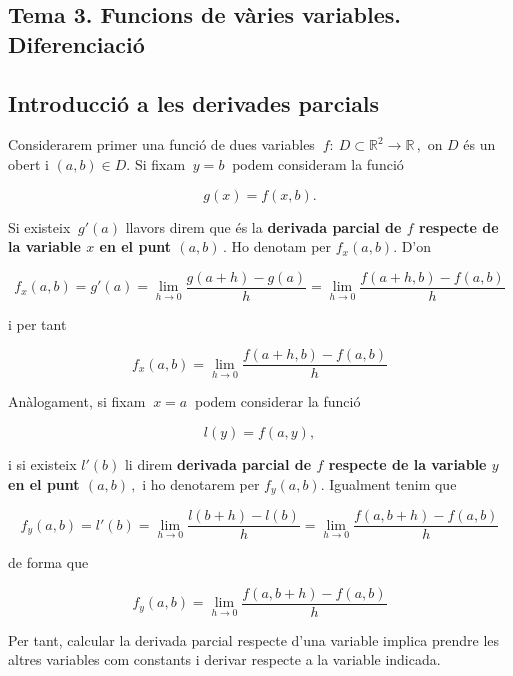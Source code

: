 \documentclass[12pt]{article}
\newcommand{\R}{\mathbb{R}}
\begin{document}
\pagestyle{fancy}
\fancyhead{}

\begin{center}
\section{Tema 3. Funcions de vàries variables. Diferenciació}
\end{center}



\parskip =0.3cm
\parindent =0cm
\itemindent=2cm

\subsection{Introducci{\'o} a les derivades parcials}

Considerarem primer una funci{\'o} de dues variables $\ f:\
D\subset \R^{2} \longrightarrow \R\,,$ on $D$ {\'e}s un obert
i $(a,b) \in D$. Si fixam $\ y=b\ $ podem consideram la funci{\'o}

\[
g(x)= f(x,b).
\]

Si  existeix $\ g'(a)$ llavors direm que {\'e}s la \textbf{derivada parcial de $f$
respecte de la variable $x$ en el punt $(a,b)\,.$} Ho denotam per
$f_{x}(a,b)$. D'on

\[
f_{x}(a,b) = g'(a) = \lim_{h\to 0} \frac{g(a+h)-g(a)}{h} =
\lim_{h\to 0} \frac{f(a+h,b)-f(a,b)}{h}
\]

i per tant

\[
f_{x}(a,b) = \lim_{h\to 0} \frac{f(a+h,b)-f(a,b)}{h}
\]

An{\`a}logament, si fixam $\ x=a\ $  podem considerar la funci{\'o}

\[
l(y)=f(a,y),
\]

i si existeix $l'(b)$ li direm \textbf{derivada parcial de $f$
respecte de la variable $y$ en el punt $(a,b)\,,$} i ho
denotarem per $f_{y}(a,b)$. Igualment tenim que

\[
f_{y}(a,b)=l'(b)=\lim_{h\to 0} \frac{l(b+h)-l(b)}{h}
=
\lim_{h\to 0} \frac{f(a,b+h)-f(a,b)}{h}
\]

de forma que

\[
f_{y}(a,b)=\lim_{h\to 0} \frac{f(a,b+h)-f(a,b)}{h}
\]

Per tant, calcular la derivada parcial respecte d'una variable
implica prendre les altres variables com constants i derivar respecte a la variable indicada.
\end{document}
